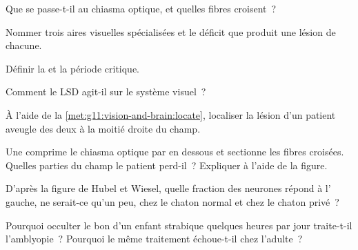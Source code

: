\begin{exercise}[$\star$]\label{exo:g11:vision-and-brain:2}
Que se passe-t-il au chiasma optique, et quelles fibres croisent~?
\end{exercise}

\begin{exercise}[$\star$]\label{exo:g11:vision-and-brain:3}
Nommer trois aires visuelles spécialisées et le déficit que produit une
lésion de chacune.
\end{exercise}

\begin{exercise}[$\star$]\label{exo:g11:vision-and-brain:4}
Définir la  et la période critique.
\end{exercise}

\begin{exercise}[$\star$]\label{exo:g11:vision-and-brain:5}
Comment le LSD agit-il sur le système visuel~?
\end{exercise}

\begin{exercise}[$\star\star$]\label{exo:g11:vision-and-brain:6}
À l'aide de la \cref{met:g11:vision-and-brain:locate}, localiser la
lésion d'un patient aveugle des deux  à la moitié droite du champ.
\end{exercise}

\begin{exercise}[$\star\star$]\label{exo:g11:vision-and-brain:7}
Une  comprime le chiasma optique par en dessous et sectionne les
fibres croisées. Quelles parties du champ le patient perd-il~?
Expliquer à l'aide de la figure.
\end{exercise}

\begin{exercise}[$\star\star$]\label{exo:g11:vision-and-brain:8}
D'après la figure de Hubel et Wiesel, quelle fraction des neurones
répond à l' gauche, ne serait-ce qu'un peu, chez le chaton normal et
chez le chaton privé~?
\end{exercise}

\begin{exercise}[$\star\star$]\label{exo:g11:vision-and-brain:9}
Pourquoi occulter le bon  d'un enfant strabique quelques heures par
jour traite-t-il l'amblyopie~? Pourquoi le même traitement échoue-t-il
chez l'adulte~?
\end{exercise}

